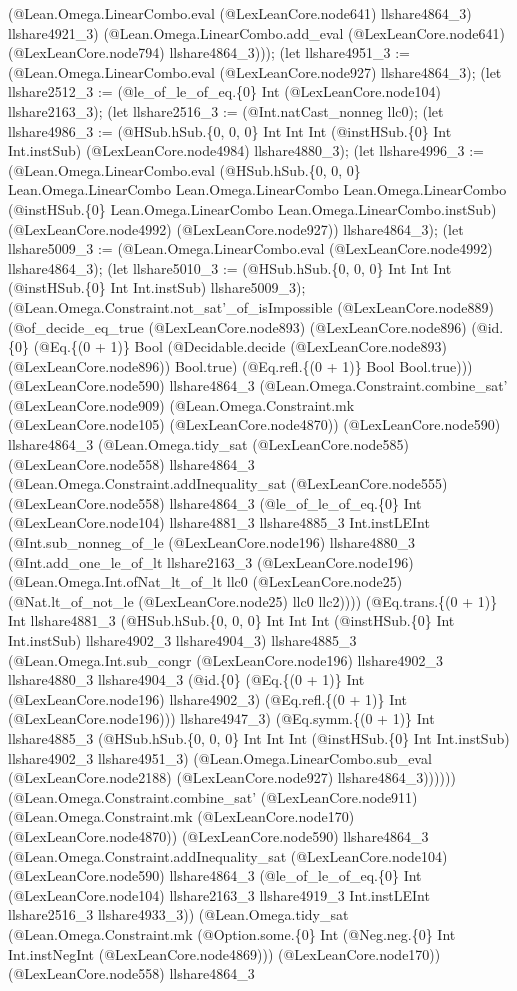 \documentclass[11pt]{article}
\begin{document}
(@Lean.Omega.LinearCombo.eval (@LexLeanCore.node641) llshare4864\_3) llshare4921\_3) (@Lean.Omega.LinearCombo.add\_eval (@LexLeanCore.node641) (@LexLeanCore.node794) llshare4864\_3))); (let llshare4951\_3 := (@Lean.Omega.LinearCombo.eval (@LexLeanCore.node927) llshare4864\_3); (let llshare2512\_3 := (@le\_of\_le\_of\_eq.\{0\} Int (@LexLeanCore.node104) llshare2163\_3); (let llshare2516\_3 := (@Int.natCast\_nonneg llc0); (let llshare4986\_3 := (@HSub.hSub.\{0, 0, 0\} Int Int Int (@instHSub.\{0\} Int Int.instSub) (@LexLeanCore.node4984) llshare4880\_3); (let llshare4996\_3 := (@Lean.Omega.LinearCombo.eval (@HSub.hSub.\{0, 0, 0\} Lean.Omega.LinearCombo Lean.Omega.LinearCombo Lean.Omega.LinearCombo (@instHSub.\{0\} Lean.Omega.LinearCombo Lean.Omega.LinearCombo.instSub) (@LexLeanCore.node4992) (@LexLeanCore.node927)) llshare4864\_3); (let llshare5009\_3 := (@Lean.Omega.LinearCombo.eval (@LexLeanCore.node4992) llshare4864\_3); (let llshare5010\_3 := (@HSub.hSub.\{0, 0, 0\} Int Int Int (@instHSub.\{0\} Int Int.instSub) llshare5009\_3); (@Lean.Omega.Constraint.not\_sat'\_of\_isImpossible (@LexLeanCore.node889) (@of\_decide\_eq\_true (@LexLeanCore.node893) (@LexLeanCore.node896) (@id.\{0\} (@Eq.\{(0 + 1)\} Bool (@Decidable.decide (@LexLeanCore.node893) (@LexLeanCore.node896)) Bool.true) (@Eq.refl.\{(0 + 1)\} Bool Bool.true))) (@LexLeanCore.node590) llshare4864\_3 (@Lean.Omega.Constraint.combine\_sat' (@LexLeanCore.node909) (@Lean.Omega.Constraint.mk (@LexLeanCore.node105) (@LexLeanCore.node4870)) (@LexLeanCore.node590) llshare4864\_3 (@Lean.Omega.tidy\_sat (@LexLeanCore.node585) (@LexLeanCore.node558) llshare4864\_3 (@Lean.Omega.Constraint.addInequality\_sat (@LexLeanCore.node555) (@LexLeanCore.node558) llshare4864\_3 (@le\_of\_le\_of\_eq.\{0\} Int (@LexLeanCore.node104) llshare4881\_3 llshare4885\_3 Int.instLEInt (@Int.sub\_nonneg\_of\_le (@LexLeanCore.node196) llshare4880\_3 (@Int.add\_one\_le\_of\_lt llshare2163\_3 (@LexLeanCore.node196) (@Lean.Omega.Int.ofNat\_lt\_of\_lt llc0 (@LexLeanCore.node25) (@Nat.lt\_of\_not\_le (@LexLeanCore.node25) llc0 llc2)))) (@Eq.trans.\{(0 + 1)\} Int llshare4881\_3 (@HSub.hSub.\{0, 0, 0\} Int Int Int (@instHSub.\{0\} Int Int.instSub) llshare4902\_3 llshare4904\_3) llshare4885\_3 (@Lean.Omega.Int.sub\_congr (@LexLeanCore.node196) llshare4902\_3 llshare4880\_3 llshare4904\_3 (@id.\{0\} (@Eq.\{(0 + 1)\} Int (@LexLeanCore.node196) llshare4902\_3) (@Eq.refl.\{(0 + 1)\} Int (@LexLeanCore.node196))) llshare4947\_3) (@Eq.symm.\{(0 + 1)\} Int llshare4885\_3 (@HSub.hSub.\{0, 0, 0\} Int Int Int (@instHSub.\{0\} Int Int.instSub) llshare4902\_3 llshare4951\_3) (@Lean.Omega.LinearCombo.sub\_eval (@LexLeanCore.node2188) (@LexLeanCore.node927) llshare4864\_3)))))) (@Lean.Omega.Constraint.combine\_sat' (@LexLeanCore.node911) (@Lean.Omega.Constraint.mk (@LexLeanCore.node170) (@LexLeanCore.node4870)) (@LexLeanCore.node590) llshare4864\_3 (@Lean.Omega.Constraint.addInequality\_sat (@LexLeanCore.node104) (@LexLeanCore.node590) llshare4864\_3 (@le\_of\_le\_of\_eq.\{0\} Int (@LexLeanCore.node104) llshare2163\_3 llshare4919\_3 Int.instLEInt llshare2516\_3 llshare4933\_3)) (@Lean.Omega.tidy\_sat (@Lean.Omega.Constraint.mk (@Option.some.\{0\} Int (@Neg.neg.\{0\} Int Int.instNegInt (@LexLeanCore.node4869))) (@LexLeanCore.node170)) (@LexLeanCore.node558) llshare4864\_3 
\end{document}
